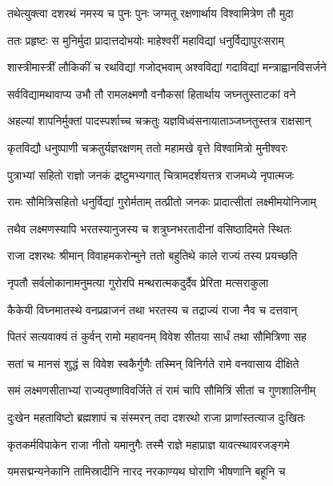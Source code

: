 \twolineshloka
{तथेत्युक्त्वा दशरथं नमस्य च पुनः पुनः}
{जग्मतू रक्षणार्थाय विश्वामित्रेण तौ मुदा} %

\twolineshloka
{ततः प्रहृष्टः स मुनिर्मुदा प्रादात्तदोभयोः}
{माहेश्वरीं महाविद्यां धनुर्विद्यापुरःसराम्} %

\twolineshloka
{शास्त्रीमास्त्रीं लौकिकीं च रथविद्यां गजोद्भवाम्}
{अश्वविद्यां गदाविद्यां मन्त्राह्वानविसर्जने} %

\twolineshloka
{सर्वविद्यामथावाप्य उभौ तौ रामलक्ष्मणौ}
{वनौकसां हितार्थाय जघ्नतुस्ताटकां वने} %

\twolineshloka
{अहल्यां शापनिर्मुक्तां पादस्पर्शाच्च चक्रतुः}
{यज्ञविध्वंसनायाताञ्जघ्नतुस्तत्र राक्षसान्} %

\twolineshloka
{कृतविद्यौ धनुष्पाणी चक्रतुर्यज्ञरक्षणम्}
{ततो महामखे वृत्ते विश्वामित्रो मुनीश्वरः} %

\twolineshloka
{पुत्राभ्यां सहितो राज्ञो जनकं द्रष्टुमभ्यगात्}
{चित्रामदर्शयत्तत्र राजमध्ये नृपात्मजः} %

\twolineshloka
{रामः सौमित्रिसहितो धनुर्विद्यां गुरोर्मताम्}
{तत्प्रीतो जनकः प्रादात्सीतां लक्ष्मीमयोनिजाम्} %

\twolineshloka
{तथैव लक्ष्मणस्यापि भरतस्यानुजस्य च}
{शत्रुघ्नभरतादीनां वसिष्ठादिमते स्थितः} %

\twolineshloka
{राजा दशरथः श्रीमान् विवाहमकरोन्मुने}
{ततो बहुतिथे काले राज्यं तस्य प्रयच्छति} %

\twolineshloka
{नृपतौ सर्वलोकानामनुमत्या गुरोरपि}
{मन्थरात्मकदुर्दैव प्रेरिता मत्सराकुला} %

\twolineshloka
{कैकेयी विघ्नमातस्थे वनप्रव्राजनं तथा}
{भरतस्य च तद्राज्यं राजा नैव च दत्तवान्} %

\twolineshloka
{पितरं सत्यवाक्यं तं कुर्वन् रामो महावनम्}
{विवेश सीतया सार्धं तथा सौमित्रिणा सह} %

\twolineshloka
{सतां च मानसं शुद्धं स विवेश स्वकैर्गुणैः}
{तस्मिन् विनिर्गते रामे वनवासाय दीक्षिते} %

\twolineshloka
{समं लक्ष्मणसीताभ्यां राज्यतृष्णाविवर्जिते}
{तं रामं चापि सौमित्रिं सीतां च गुणशालिनीम्} %

\twolineshloka
{दुःखेन महताविष्टो ब्रह्मशापं च संस्मरन्}
{तदा दशरथो राजा प्राणांस्तत्याज दुःखितः} %

\twolineshloka
{कृतकर्मविपाकेन राजा नीतो यमानुगैः}
{तस्मै राज्ञे महाप्राज्ञ यावत्स्थावरजङ्गमे} %

\twolineshloka
{यमसद्मन्यनेकानि तामिस्रादीनि नारद}
{नरकाण्यथ घोराणि भीषणानि बहूनि च} %


